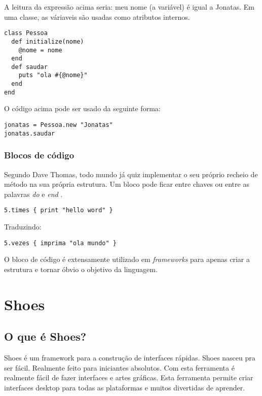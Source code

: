 \documentclass[12pt]{article}
\begin{document}
A leitura da expressão acima seria: meu nome (a variável) é igual a Jonatas.
Em uma classe, as váriaveis são usadas como atributos internos.

\begin{lstlisting}[caption=Exemplo de variável de instância em uma classe ]
class Pessoa
  def initialize(nome)
    @nome = nome
  end
  def saudar
    puts "ola #{@nome}"
  end
end
\end{lstlisting}

O código acima pode ser usado da seguinte forma:

\begin{lstlisting}[caption=Exemplo de utilização da classe descrita acima ]
jonatas = Pessoa.new "Jonatas"
jonatas.saudar 
\end{lstlisting}

\subsubsection { Blocos de código }

\cite{programmingRuby}
Segundo Dave Thomas, todo mundo já quiz implementar o seu próprio recheio de método na sua própria estrutura. Um bloco pode ficar entre chaves ou entre as palavras \textit{ do } e \textit{ end }.

\begin{lstlisting}[caption=Exemplo de bloco de código ]
   5.times { print "hello word" }
\end{lstlisting}

Traduzindo: 
\begin{lstlisting}[caption=Exemplo de bloco de código ]
   5.vezes { imprima "ola mundo" }
\end{lstlisting}

O bloco de código é extensamente utilizado em \textit{frameworks} para apenas criar a estrutura e tornar óbvio o objetivo da linguagem.



\section{ Shoes }

\subsection{O que é Shoes?}

Shoes é um framework para a construção de interfaces rápidas. Shoes nasceu pra ser fácil. Realmente feito para iniciantes absolutos. Com esta ferramenta é realmente fácil de fazer interfaces e artes gráficas. 
Esta ferramenta permite criar interfaces desktop para todas as plataformas e muitos divertidas de aprender.
\end{document}
